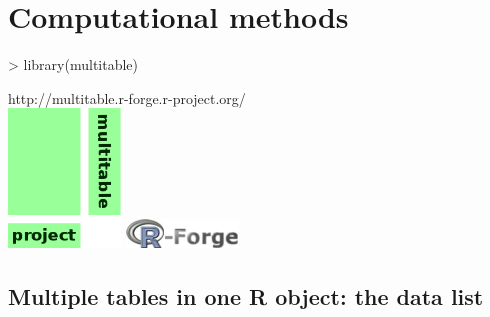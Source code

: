 \documentclass{beamer}
\numberwithin{exercise}{section}
\begin{document}
\section[Methods]{Computational methods}

\begin{frame}[fragile]
\begin{Schunk}
\begin{Sinput}
> library(multitable)
\end{Sinput}
\end{Schunk}
http://multitable.r-forge.r-project.org/ \\
\vspace{0.3cm}
\includegraphics[width=3cm]{multitablelogo} \quad
\includegraphics[width=3cm]{Rforgelogo}
\end{frame}

\subsection[Data lists]{Multiple tables in one R object: the data list}
\end{document}
